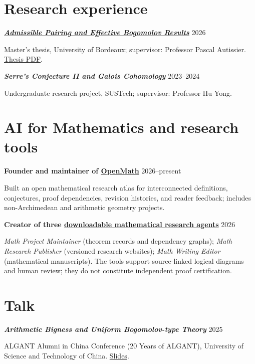 \documentclass[10pt,letterpaper]{article}
\newcommand{\rightdate}[1]{\hfill{\footnotesize\sffamily\color{muted} #1}}
\newcommand{\entrytitle}[2]{\needspace{3\baselineskip}\textbf{#1}\rightdate{#2}\par}
\newcommand{\subnote}[1]{{\color{muted}#1}\par}
\newcommand{\indented}[1]{\begin{list}{}{\setlength{\leftmargin}{1.05em}\setlength{\rightmargin}{0em}\setlength{\topsep}{0pt}\setlength{\itemsep}{0pt}\setlength{\parsep}{0pt}}\item #1\end{list}}
\begin{document}
\section*{Research experience}
\entrytitle{\href{https://github.com/DongKaicheng/thesis-supplementary-files/releases/download/v1.0/Dong_Kaicheng_Master_Thesis.pdf.pdf}{\emph{Admissible Pairing and Effective Bogomolov Results}}}{2026}
\subnote{Master's thesis, University of Bordeaux; supervisor: Professor Pascal Autissier. \href{https://github.com/DongKaicheng/thesis-supplementary-files/releases/download/v1.0/Dong_Kaicheng_Master_Thesis.pdf.pdf}{Thesis PDF}.}
\vspace{5pt}
\entrytitle{\emph{Serre's Conjecture II and Galois Cohomology}}{2023--2024}
\subnote{Undergraduate research project, SUSTech; supervisor: Professor Hu Yong.}


\section*{AI for Mathematics and research tools}
\entrytitle{Founder and maintainer of \href{https://openmath-atlas.org/}{OpenMath}}{2026--present}
\indented{Built an open mathematical research atlas for interconnected definitions, conjectures, proof dependencies, revision histories, and reader feedback; includes non-Archimedean and arithmetic geometry projects.}
\vspace{2pt}
\entrytitle{Creator of three \href{https://openmath-atlas.org/ai-and-math/}{downloadable mathematical research agents}}{2026}
\indented{\emph{Math Project Maintainer} (theorem records and dependency graphs); \emph{Math Research Publisher} (versioned research websites); \emph{Math Writing Editor} (mathematical manuscripts). The tools support source-linked logical diagrams and human review; they do not constitute independent proof certification.}

\clearpage
\section*{Talk}
\entrytitle{\emph{Arithmetic Bigness and Uniform Bogomolov-type Theory}}{2025}
ALGANT Alumni in China Conference (20 Years of ALGANT), University of Science and Technology of China.
\href{https://faculty.ustc.edu.cn/yqliang/files/ALGANTSlides/25DongKaicheng.pdf}{Slides}.
\end{document}
